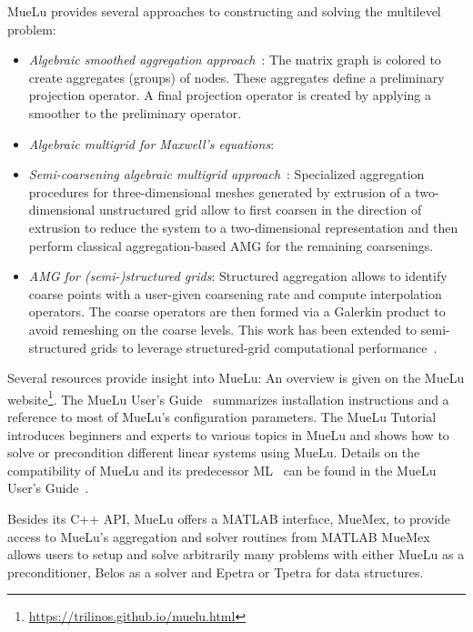
MueLu provides several approaches to constructing and solving the multilevel problem:

\begin{itemize}
\item \emph{Algebraic smoothed aggregation approach}~\cite{Vanek1996a}:
The matrix graph is colored to create aggregates (groups) of nodes.
These aggregates define a preliminary projection operator.
A final projection operator is created by applying a smoother to the preliminary operator.

\item \emph{Algebraic multigrid for Maxwell’s equations}:

\item \emph{Semi-coarsening algebraic multigrid approach}~:
Specialized aggregation procedures for three-dimensional meshes generated by extrusion of a two-dimensional unstructured grid
allow to first coarsen in the direction of extrusion to reduce the system to a two-dimensional representation and then perform classical aggregation-based AMG
for the remaining coarsenings.

\item \emph{AMG for (semi-)structured grids}:
Structured aggregation allows to identify coarse points with a user-given coarsening rate and compute interpolation operators.
The coarse operators are then formed via a Galerkin product to avoid remeshing on the coarse levels.
This work has been extended to semi-structured grids to leverage structured-grid computational performance~\cite{Mayr2022a}.

\end{itemize}

Several resources provide insight into MueLu:
An overview is given on the MueLu website\footnote{\url{https://trilinos.github.io/muelu.html}}.
The MueLu User's Guide~\cite{BergerVergiat2023a} summarizes installation instructions and a reference to most of MueLu's configuration parameters.
The MueLu Tutorial~\cite{Mayr2023b} introduces beginners and experts to various topics in MueLu and shows how to solve or precondition different linear systems using MueLu.
Details on the compatibility of MueLu and its predecessor ML~\cite{Heroux2005a,Gee2006a} can be found in the MueLu User's Guide~\cite{BergerVergiat2023a}.

Besides its C++ API, MueLu offers a MATLAB interface, MueMex, to provide access to MueLu's aggregation and solver routines from MATLAB
MueMex allows users to setup and solve arbitrarily many problems with either MueLu as a preconditioner, Belos as a solver and Epetra or Tpetra for data structures.



